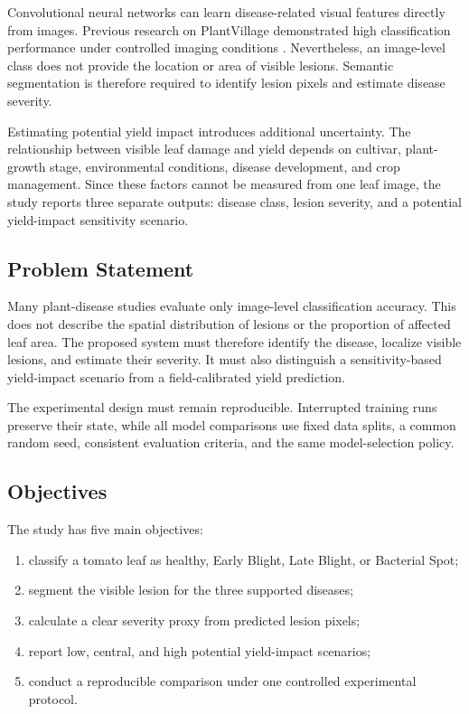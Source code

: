 \documentclass[12pt,a4paper]{article}
\begin{document}
Convolutional neural networks can learn disease-related visual features directly from
images. Previous research on PlantVillage demonstrated high classification performance
under controlled imaging conditions \cite{mohanty2016plantdisease}. Nevertheless, an
image-level class does not provide the location or area of visible lesions. Semantic
segmentation is therefore required to identify lesion pixels and estimate disease severity.

Estimating potential yield impact introduces additional uncertainty. The relationship
between visible leaf damage and yield depends on cultivar, plant-growth stage,
environmental conditions, disease development, and crop management. Since these factors
cannot be measured from one leaf image, the study reports three separate outputs: disease
class, lesion severity, and a potential yield-impact sensitivity scenario.

\subsection{Problem Statement}
Many plant-disease studies evaluate only image-level classification accuracy. This does
not describe the spatial distribution of lesions or the proportion of affected leaf area.
The proposed system must therefore identify the disease, localize visible lesions, and
estimate their severity. It must also distinguish a sensitivity-based yield-impact scenario
from a field-calibrated yield prediction.

The experimental design must remain reproducible. Interrupted training runs preserve
their state, while all model comparisons use fixed data splits, a common random seed,
consistent evaluation criteria, and the same model-selection policy.

\subsection{Objectives}
The study has five main objectives:
\begin{enumerate}[label=\arabic*.]
  \item classify a tomato leaf as healthy, Early Blight, Late Blight, or Bacterial Spot;
  \item segment the visible lesion for the three supported diseases;
  \item calculate a clear severity proxy from predicted lesion pixels;
  \item report low, central, and high potential yield-impact scenarios;
  \item conduct a reproducible comparison under one controlled experimental protocol.
\end{enumerate}
\end{document}
